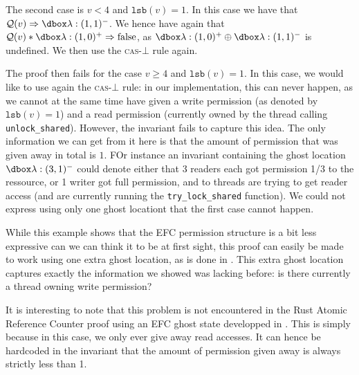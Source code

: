The second case is $v < 4$ and $\texttt{lsb}(v) = 1$. In this case we have that $\mathcal{Q}(v) \Rightarrow \efcm{1}{1}$. We hence have again that  $\mathcal{Q}(v) * \efcp{1}{0} \Rightarrow \text{false}$, as $\efcp{1}{0} \oplus \efcm{1}{1}$ is undefined. We then use the \textsc{cas}-$\bot$ rule again.

The proof then fails for the case $v \ge 4$ and $\texttt{lsb}(v) = 1$. In this case, we would like to use again the \textsc{cas}-$\bot$ rule: in our implementation, this can never happen, as we cannot at the same time have given a write permission (as denoted by $\texttt{lsb}(v) = 1$) and a read permission (currently owned by the thread calling \texttt{unlock\_shared}). However, the invariant fails to capture this idea. The only information we can get from it here is that the amount of permission that was given away in total is $1$. FOr instance an invariant containing the ghost location $\ghost{\lambda:(3, 1)^-}$ could denote either that 3 readers each got permission 1/3 to the ressource, or 1 writer got full permission, and to threads are trying to get reader access (and are currently running the \texttt{try\_lock\_shared} function). We could not express using only one ghost locationt that the first case cannot happen.

While this example shows that the EFC permission structure is a bit less expressive can we can think it to be at first sight, this proof can easily be made to work using one extra ghost location, as is done in \cite{gaurav}. This extra ghost location captures exactly the information we showed was lacking before: is there currently a thread owning write permission?

It is interesting to note that this problem is not encountered in the Rust Atomic Reference Counter proof using an EFC ghost state developped in \cite{gaurav}. This is simply because in this case, we only ever give away read accesses. It can hence be hardcoded in the invariant that the amount of permission given away is always strictly less than 1.


